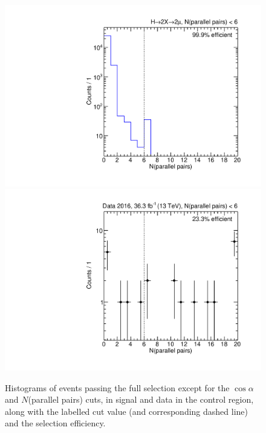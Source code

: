 \begin{figure}[p]
  \centering
  \includegraphics[width=\DSquareWidth]{figures/displaced/NM1_2Mu2J_Npp.pdf}
  \hspace*{-2em}
  \includegraphics[width=\DSquareWidth]{figures/displaced/NM1_Data_Npp.pdf}
  \caption[Histograms of events passing the full selection except for the $\cos{\alpha}$ and $N$(parallel pairs) cuts in \twoMu signal and data.]{Histograms of events passing the full selection except for the $\cos{\alpha}$ and $N$(parallel pairs) cuts, in  \twoMu signal and  data in the control region, along with the labelled cut value (and corresponding dashed line) and the selection efficiency.}
  \label{fig:dd:NM1_Npp}
\end{figure}

